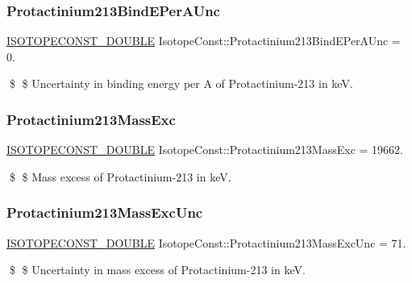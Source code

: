 \subsubsection{\texorpdfstring{Protactinium213\+Bind\+E\+Per\+A\+Unc}{Protactinium213BindEPerAUnc}}
{\footnotesize\ttfamily \mbox{\hyperlink{group___isotope_const-_macros_ga8f45a7272ce02c0b4c65c44636ed719a}{I\+S\+O\+T\+O\+P\+E\+C\+O\+N\+S\+T\+\_\+\+D\+O\+U\+B\+LE}} Isotope\+Const\+::\+Protactinium213\+Bind\+E\+Per\+A\+Unc = 0.}

\$ \$ Uncertainty in binding energy per A of Protactinium-\/213 in keV. \mbox{\label{group___isotope_const-_protactinium-_pa213_gad6ee86cf75d0ab6ae6933a5c6726de4b}} 
\subsubsection{\texorpdfstring{Protactinium213\+Mass\+Exc}{Protactinium213MassExc}}
{\footnotesize\ttfamily \mbox{\hyperlink{group___isotope_const-_macros_ga8f45a7272ce02c0b4c65c44636ed719a}{I\+S\+O\+T\+O\+P\+E\+C\+O\+N\+S\+T\+\_\+\+D\+O\+U\+B\+LE}} Isotope\+Const\+::\+Protactinium213\+Mass\+Exc = 19662.}

\$ \$ Mass excess of Protactinium-\/213 in keV. \mbox{\label{group___isotope_const-_protactinium-_pa213_ga1a58876e5ddc3090c878efacd49cbb6a}} 
\subsubsection{\texorpdfstring{Protactinium213\+Mass\+Exc\+Unc}{Protactinium213MassExcUnc}}
{\footnotesize\ttfamily \mbox{\hyperlink{group___isotope_const-_macros_ga8f45a7272ce02c0b4c65c44636ed719a}{I\+S\+O\+T\+O\+P\+E\+C\+O\+N\+S\+T\+\_\+\+D\+O\+U\+B\+LE}} Isotope\+Const\+::\+Protactinium213\+Mass\+Exc\+Unc = 71.}

\$ \$ Uncertainty in mass excess of Protactinium-\/213 in keV. \mbox{\label{group___isotope_const-_protactinium-_pa213_gad852166ffcaa6ca6852be83d9100368a}} 

